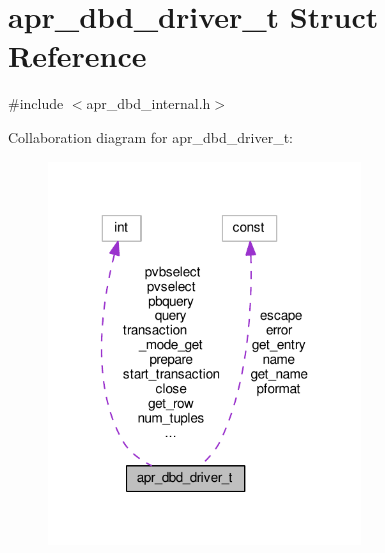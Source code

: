 \hypertarget{structapr__dbd__driver__t}{}\section{apr\+\_\+dbd\+\_\+driver\+\_\+t Struct Reference}
\label{structapr__dbd__driver__t}


{\ttfamily \#include $<$apr\+\_\+dbd\+\_\+internal.\+h$>$}



Collaboration diagram for apr\+\_\+dbd\+\_\+driver\+\_\+t\+:
\nopagebreak
\begin{figure}[H]
\begin{center}
\leavevmode
\includegraphics[width=235pt]{structapr__dbd__driver__t__coll__graph}
\end{center}
\end{figure}
